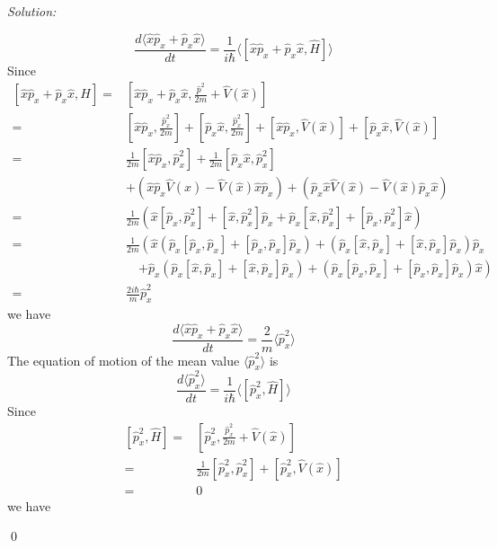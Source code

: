 \documentclass[12pt,a4paper]{article}
\newenvironment{sol}
    {\emph{Solution:}
    }
    {
    \qed
    }
\begin{document}
\begin{sol}
\begin{itemize}
\begin{equation}
\frac{d\langle\hat{x}\hat{p}_x+\hat{p}_x\hat{x}\rangle}{dt}=\frac{1}{i\hbar}\langle[\hat{x}\hat{p}_x+\hat{p}_x\hat{x},\hat{H}]\rangle
\end{equation}
Since
\begin{align}
\nonumber[\hat{x}\hat{p}_x+\hat{p}_x\hat{x},\hat{H}]=&[\hat{x}\hat{p}_x+\hat{p}_x\hat{x},\frac{\hat{p}^2}{2m}+\hat{V}(\hat{x})]\\
\nonumber=&[\hat{x}\hat{p}_x,\frac{\hat{p}_x^2}{2m}]+[\hat{p}_x\hat{x},\frac{\hat{p}_x^2}{2m}]+[\hat{x}\hat{p}_x,\hat{V}(\hat{x})]+[\hat{p}_x\hat{x},\hat{V}(\hat{x})]\\
\nonumber=&\frac{1}{2m}[\hat{x}\hat{p}_x,\hat{p}_x^2]+\frac{1}{2m}[\hat{p}_x\hat{x},\hat{p}_x^2]\\
\nonumber&+(\hat{x}\hat{p}_x\hat{V}(\hat{x})-\hat{V}(\hat{x})\hat{x}\hat{p}_x)+(\hat{p}_x\hat{x}\hat{V}(\hat{x})-\hat{V}(\hat{x})\hat{p}_x\hat{x})\\
\nonumber=&\frac{1}{2m}\left(\hat{x}[\hat{p}_x,\hat{p}_x^2]+[\hat{x},\hat{p}_x^2]\hat{p}_x+\hat{p}_x[\hat{x},\hat{p}_x^2]+[\hat{p}_x,\hat{p}_x^2]\hat{x}\right)\\
\nonumber=&\frac{1}{2m}\left(\hat{x}(\hat{p}_x[\hat{p}_x,\hat{p}_x]+[\hat{p}_x,\hat{p}_x]\hat{p}_x)+(\hat{p}_x[\hat{x},\hat{p}_x]+[\hat{x},\hat{p}_x]\hat{p}_x)\hat{p}_x\right.\\
\nonumber&\quad\left.+\hat{p}_x(\hat{p}_x[\hat{x},\hat{p}_x]+[\hat{x},\hat{p}_x]\hat{p}_x)+(\hat{p}_x[\hat{p}_x,\hat{p}_x]+[\hat{p}_x,\hat{p}_x]\hat{p}_x)\hat{x}\right)\\
=&\frac{2i\hbar}{m}\hat{p}_x^2
\end{align}
we have
\begin{equation}
\frac{d\langle\hat{x}\hat{p}_x+\hat{p}_x\hat{x}\rangle}{dt}=\frac{2}{m}\langle\hat{p}_x^2\rangle
\end{equation}
The equation of motion of the mean value $\langle\hat{p}_x^2\rangle$ is
\begin{equation}
\frac{d\langle\hat{p}_x^2\rangle}{dt}=\frac{1}{i\hbar}\langle[\hat{p}_x^2,\hat{H}]\rangle
\end{equation}
Since
\begin{align}
\nonumber[\hat{p}_x^2,\hat{H}]=&[\hat{p}_x^2,\frac{\hat{p}_x^2}{2m}+\hat{V}(\hat{x})]\\
\nonumber=&\frac{1}{2m}[\hat{p}_x^2,\hat{p}_x^2]+[\hat{p}_x^2,\hat{V}(\hat{x})]\\
=&0
\end{align}
we have
\begin{equation}

\end{equation}
\end{itemize}
\end{sol}
\end{document}
